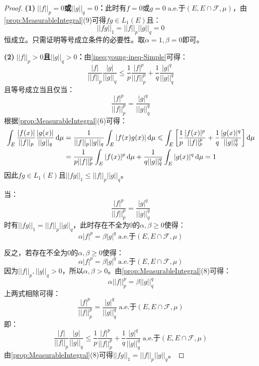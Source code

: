 \begin{proof}
	\textbf{(1)$\;||f||_p=0$或$||g||_q=0$：}此时有$f=0$或$g=0\;$a.e.于$(E,E\cap\mathscr{F},\mu)$，由\cref{prop:MeasurableIntegral}(9)可得$fg\in L_1(E)$且：
	\begin{equation*}
		||fg||_1=||f||_p||g||_q=0
	\end{equation*}
	恒成立。只需证明等号成立条件的必要性。取$\alpha=1,\beta=0$即可。\par
	\textbf{(2)$\;||f||_p>0$且$||g||_q>0$：}由\cref{ineq:young-ineq-Simple}可得：
	\begin{equation*}
		\frac{|f|}{||f||_p}\frac{|g|}{||g||_q}\leqslant\frac{1}{p}\frac{|f|^p}{||f||_p^p}+\frac{1}{q}\frac{|g|^q}{||g||_q^q}
	\end{equation*}
	且等号成立当且仅当：
	\begin{equation*}
		\frac{|f|^p}{||f||_p^p}=\frac{|g|^q}{||g||_q^q}
	\end{equation*}
	根据\cref{prop:MeasurableIntegral}(6)可得：
	\begin{align*}
		\int_{E}\frac{|f(x)|}{||f||_p}\frac{|g(x)|}{||g||_q}\mathop{}\!\mathrm{d}\mu&=\frac{1}{||f||_p||g||_q}\int_{E}|f(x)g(x)|\mathop{}\!\mathrm{d}\mu\leqslant\int_{E}\left[\frac{1}{p}\frac{|f(x)|^p}{||f||_p^p}+\frac{1}{q}\frac{|g(x)|^q}{||g||_q^q}\right]\mathop{}\!\mathrm{d}\mu \\
		&=\frac{1}{p||f||_p^p}\int_{E}|f(x)|^p\mathop{}\!\mathrm{d}\mu+\frac{1}{q||g||_q^q}\int_{E}|g(x)|^q\mathop{}\!\mathrm{d}\mu=1
	\end{align*}
	因此$fg\in L_1(E)$且$||fg||_1\leqslant||f||_p||g||_q$。\par
	当：
	\begin{equation*}
		\frac{|f|^p}{||f||_p^p}=\frac{|g|^q}{||g||_q^q}
	\end{equation*}
	时有$||fg||_1=||f||_p||g||_q$，此时存在不全为$0$的$\alpha,\beta\geqslant0$使得：
	\begin{equation*}
		\alpha|f|^p=\beta|g|^q\;\text{a.e.于$(E,E\cap\mathscr{F},\mu)$}
	\end{equation*}\par
	反之，若存在不全为$0$的$\alpha,\beta\geqslant0$使得：
	\begin{equation*}
		\alpha|f|^p=\beta|g|^q\;\text{a.e.于$(E,E\cap\mathscr{F},\mu)$}
	\end{equation*}
	因为$||f||_p,||g||_q>0$，所以$\alpha,\beta>0$。由\cref{prop:MeasurableIntegral}(8)可得：
	\begin{equation*}
		\alpha||f||_p^p=\beta||g||_q^q
	\end{equation*}
	上两式相除可得：
	\begin{equation*}
		\frac{|f|^p}{||f||_p^p}=\frac{|g|^q}{||g||_q^q}\;\text{a.e.于$(E,E\cap\mathscr{F},\mu)$}
	\end{equation*}
	即：
	\begin{equation*}
		\frac{|f|}{||f||_p}\frac{|g|}{||g||_q}\leqslant\frac{1}{p}\frac{|f|^p}{||f||_p^p}+\frac{1}{q}\frac{|g|^q}{||g||_q^q}\;\text{a.e.于$(E,E\cap\mathscr{F},\mu)$}
	\end{equation*}
	由\cref{prop:MeasurableIntegral}(8)可得$||fg||_1=||f||_p||g||_q$。
\end{proof}
